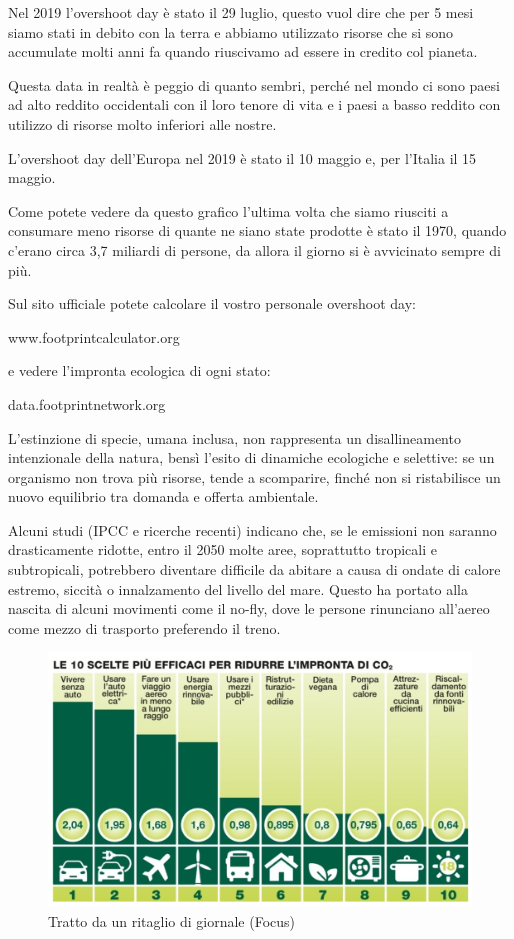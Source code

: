 \documentclass[12pt]{book} %
\begin{document}
Nel 2019 l'overshoot day è stato il 29 luglio, questo vuol dire che per 5 mesi siamo stati in
debito con la terra e abbiamo utilizzato risorse che si sono accumulate molti anni fa quando riuscivamo ad essere in
credito col pianeta.

Questa data in realtà è peggio di quanto sembri, perché nel mondo ci sono paesi ad alto reddito occidentali con il loro tenore di vita e i
paesi a basso reddito con utilizzo di risorse molto inferiori alle nostre.

L'overshoot day dell'Europa nel 2019 è stato il 10 maggio e, per l'Italia il
15 maggio.

Come potete vedere da questo grafico l'ultima volta che siamo riusciti a consumare meno risorse di
quante ne siano state prodotte è stato il 1970, quando c'erano circa 3,7 miliardi di persone, da
allora il giorno si è avvicinato sempre di
più.

Sul sito ufficiale potete calcolare il vostro personale overshoot day:

www.footprintcalculator.org 

e vedere l'impronta ecologica di ogni stato:

data.footprintnetwork.org

L’estinzione di specie, umana inclusa, non rappresenta un disallineamento intenzionale della natura, bensì l’esito di dinamiche ecologiche e selettive: se un organismo non trova più risorse, tende a scomparire, finché non si ristabilisce un nuovo equilibrio tra domanda e offerta ambientale.

Alcuni studi (IPCC e ricerche recenti) indicano che, se le emissioni non saranno drasticamente ridotte, entro il 2050 molte aree, soprattutto tropicali e subtropicali, potrebbero diventare difficile da abitare a causa di ondate di calore estremo, siccità o innalzamento del livello del mare. Questo ha portato alla nascita di alcuni movimenti come il no-fly, dove le persone rinunciano all'aereo come mezzo di trasporto preferendo il treno.

\needspace{4cm}
\begin{figure}[H]
  \centering
  \includegraphics[width=0.95\linewidth]{images/Libro-img019.jpg}
  \caption{Tratto da un ritaglio di giornale (Focus)}
\end{figure}
\end{document}
